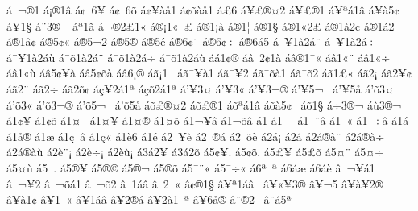 {^^e1^^a0^^ac^^ae1
^^e1^^a1^^ae1^^e2
^^e1^^a2^^a06^^a5
^^e1^^a2^^a06^^f5
^^e1^^a2^^a5^^e0^^e51
^^e1^^a2^^f5^^e0^^e51
^^e1^^a36
^^e1^^a5^^a3^^ae^^a42
^^e1^^a5^^a3^^ae1
^^e1^^a5^^aa^^e11^^e2
^^e1^^a5^^e05^^a2^^a0
^^e1^^a51^^a7
^^e1^^a83^^ae^^ac
^^e1^^aa1^^ad^^e3
^^e1^^ac^^ae2^^a31^^ab
^^e1^^ae^^a11^^ab^^a0^^a3
^^e1^^ae1^^a1^^e0
^^e1^^ae1^^a6
^^e1^^ae1^^a7
^^e1^^ae1^^ab2^^a3
^^e1^^ae1^^e02^^a2
^^e1^^ae1^^e12
^^e1^^ae1^^e2^^a2
^^e1^^ae5^^a2^^ab
^^e1^^ae5^^ac2
^^e1^^ae5^^ae
^^e1^^ae5^^e9
^^e1^^ae6^^a2^^a8^^ad
^^e1^^ae6^^a2^^f7^^ad
^^e1^^ae6^^e15^^ad
^^e1^^af^^a51^^e02^^e1^^a8
^^e1^^af^^a51^^e02^^e1^^f7
^^e1^^af^^a51^^e02^^e1^^f9
^^e1^^af^^f51^^e02^^e1^^a8
^^e1^^af^^f51^^e02^^e1^^f7
^^e1^^af^^f51^^e02^^e1^^f9
^^e1^^e11^^a2^^ae
^^e1^^e2^^a02^^a21^^e0
^^e1^^e2^^ae1^^af^^ab
^^e1^^e21^^ab^^a8
^^e1^^e21^^ab^^f7
^^e1^^e21^^ab^^f9
^^e1^^e25^^a2^^a5^^e0
^^e1^^e25^^a2^^f5^^e0
^^e1^^e26^^a1^^ae
^^e1^^e3^^a11^^a0
^^e1^^e3^^af^^a5^^e01
^^e1^^e3^^af^^a52
^^e1^^e3^^af^^f5^^e01
^^e1^^e3^^af^^f52
^^e1^^e31^^a3^^ab
^^e1^^e32^^a1
^^e1^^e32^^a5^^a2
^^e1^^e32^^ad^^a8
^^e1^^e32^^ad^^f7
^^e1^^e32^^f5^^a2
^^e1^^e7^^a52^^e11^^aa
^^e1^^e7^^f52^^e11^^aa
^^e1'^^a53^^a4
^^e1'^^a53^^ab
^^e1'^^a53^^ac^^ae
^^e1'^^a55^^ac^^a0
^^e1'^^a55^^e5
^^e1'^^f53^^a4
^^e1'^^f53^^ab
^^e1'^^f53^^ac^^ae
^^e1'^^f55^^ac^^a0
^^e1'^^f55^^e5
^^e1^^f5^^a3^^ae^^a42
^^e1^^f5^^a3^^ae1
^^e1^^f5^^aa^^e11^^e2
^^e1^^f5^^e05^^a2^^a0
^^e1^^f51^^a7
^^e1^^f73^^ae^^ac
^^e1^^f93^^ae^^ac
^^e11^^a2^^a5^^ad
^^e11^^a2^^f5^^ad
^^e11^^a4^^a0
^^e11^^a4^^a5
^^e11^^a4^^ae
^^e11^^a4^^f5
^^e11^^ac^^a5^^e2
^^e11^^ac^^f5^^e2
^^e11^^ad
^^e11^^af^^a0
^^e11^^af^^a8^^e2
^^e11^^af^^ab
^^e11^^af^^f7^^e2
^^e11^^e1
^^e11^^e5^^ae
^^e11^^e6
^^e11^^e7^^a0^^e2
^^e11^^e7^^ab
^^e11^^e86
^^e11^^e9
^^e12^^af^^a5^^e8
^^e12^^af^^ae^^e1
^^e12^^af^^f5^^e8
^^e12^^e1^^a1
^^e12^^e1^^ad
^^e12^^e1^^ae^^e0^^a8
^^e12^^e1^^ae^^e0^^f7
^^e12^^e1^^ae^^e0^^f9
^^e12^^e8^^a8^^a1
^^e12^^e8^^f7^^a1
^^e12^^e8^^f9^^a1
^^e13^^e12^^ad^^a5
^^e13^^e12^^ad^^f5
^^e15^^a2^^a5.
^^e15^^a2^^f5.
^^e15^^a3^^a5
^^e15^^a3^^f5
^^e15^^a4^^a8
^^e15^^a4^^f7
^^e15^^a4^^f9
^^e15^^ad^^a0.
^^e15^^ad^^ae^^a5
^^e15^^ad^^ae^^a9
^^e15^^ad^^ae^^ac
^^e15^^ad^^ae^^f5
^^e15^^af^^a8^^ab
^^e15^^af^^f7^^ab
^^e16^^aa^^a0^^aa
^^e16^^e1^^e6
^^e16^^e1^^e8
^^e2^^a0^^ac^^a5^^e11
^^e2^^a0^^ac^^a52
^^e2^^a0^^ac^^f5^^e11
^^e2^^a0^^ac^^f52
^^e2^^a01^^e1^^e2
^^e2^^a02^^ad^^a0^^ab
^^e2^^a2^^ae1^^a7
^^e2^^a5^^aa1^^e1^^e2^^a0
^^e2^^a5^^ab^^a53^^ae
^^e2^^a5^^ac5^^ad
^^e2^^a5^^e0^^a52^^ae
^^e2^^a5^^e01^^a2
^^e2^^a51^^af^^ab
^^e2^^a51^^e1^^e2
^^e2^^a52^^ae^^e1
^^e2^^a52^^e01^^a0^^aa
^^e2^^a56^^e5^^ae
^^e2^^a8^^ae2^^af
^^e2^^a8^^e15^^aa
}
